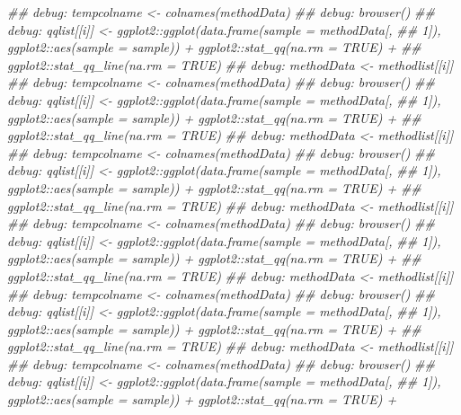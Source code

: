 \documentclass[]{article}
\newcommand{\hlcom}[1]{\textcolor[rgb]{0.502,0.502,0.502}{\textit{#1}}}%
\newenvironment{Shaded}{\begin{myshaded}}{\end{myshaded}}
\newcommand{\DocumentationTok}[1]{\hlcom{#1}}
\begin{document}
\begin{Shaded}
\begin{Highlighting}[]
\DocumentationTok{\#\# debug: tempcolname \textless{}{-} colnames(methodData)}
\DocumentationTok{\#\# debug: browser()}
\DocumentationTok{\#\# debug: qqlist[[i]] \textless{}{-} ggplot2::ggplot(data.frame(sample = methodData[, }
\DocumentationTok{\#\#     1]), ggplot2::aes(sample = sample)) + ggplot2::stat\_qq(na.rm = TRUE) + }
\DocumentationTok{\#\#     ggplot2::stat\_qq\_line(na.rm = TRUE)}
\DocumentationTok{\#\# debug: methodData \textless{}{-} methodlist[[i]]}
\DocumentationTok{\#\# debug: tempcolname \textless{}{-} colnames(methodData)}
\DocumentationTok{\#\# debug: browser()}
\DocumentationTok{\#\# debug: qqlist[[i]] \textless{}{-} ggplot2::ggplot(data.frame(sample = methodData[, }
\DocumentationTok{\#\#     1]), ggplot2::aes(sample = sample)) + ggplot2::stat\_qq(na.rm = TRUE) + }
\DocumentationTok{\#\#     ggplot2::stat\_qq\_line(na.rm = TRUE)}
\DocumentationTok{\#\# debug: methodData \textless{}{-} methodlist[[i]]}
\DocumentationTok{\#\# debug: tempcolname \textless{}{-} colnames(methodData)}
\DocumentationTok{\#\# debug: browser()}
\DocumentationTok{\#\# debug: qqlist[[i]] \textless{}{-} ggplot2::ggplot(data.frame(sample = methodData[, }
\DocumentationTok{\#\#     1]), ggplot2::aes(sample = sample)) + ggplot2::stat\_qq(na.rm = TRUE) + }
\DocumentationTok{\#\#     ggplot2::stat\_qq\_line(na.rm = TRUE)}
\DocumentationTok{\#\# debug: methodData \textless{}{-} methodlist[[i]]}
\DocumentationTok{\#\# debug: tempcolname \textless{}{-} colnames(methodData)}
\DocumentationTok{\#\# debug: browser()}
\DocumentationTok{\#\# debug: qqlist[[i]] \textless{}{-} ggplot2::ggplot(data.frame(sample = methodData[, }
\DocumentationTok{\#\#     1]), ggplot2::aes(sample = sample)) + ggplot2::stat\_qq(na.rm = TRUE) + }
\DocumentationTok{\#\#     ggplot2::stat\_qq\_line(na.rm = TRUE)}
\DocumentationTok{\#\# debug: methodData \textless{}{-} methodlist[[i]]}
\DocumentationTok{\#\# debug: tempcolname \textless{}{-} colnames(methodData)}
\DocumentationTok{\#\# debug: browser()}
\DocumentationTok{\#\# debug: qqlist[[i]] \textless{}{-} ggplot2::ggplot(data.frame(sample = methodData[, }
\DocumentationTok{\#\#     1]), ggplot2::aes(sample = sample)) + ggplot2::stat\_qq(na.rm = TRUE) + }
\DocumentationTok{\#\#     ggplot2::stat\_qq\_line(na.rm = TRUE)}
\DocumentationTok{\#\# debug: methodData \textless{}{-} methodlist[[i]]}
\DocumentationTok{\#\# debug: tempcolname \textless{}{-} colnames(methodData)}
\DocumentationTok{\#\# debug: browser()}
\DocumentationTok{\#\# debug: qqlist[[i]] \textless{}{-} ggplot2::ggplot(data.frame(sample = methodData[, }
\DocumentationTok{\#\#     1]), ggplot2::aes(sample = sample)) + ggplot2::stat\_qq(na.rm = TRUE) + }

\end{Highlighting}
\end{Shaded}
\end{document}
